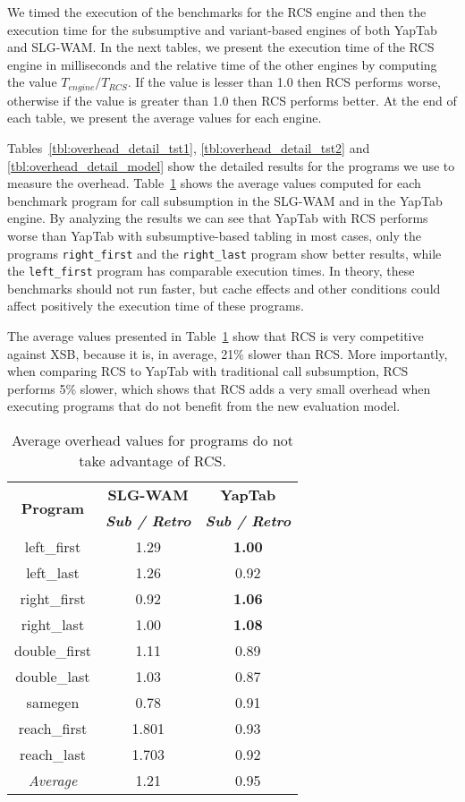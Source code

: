 We timed the execution of the benchmarks for the RCS engine and then the execution time
for the subsumptive and variant-based engines of both YapTab and SLG-WAM. In the next tables,
we present the execution time of the RCS engine in milliseconds and the relative time
of the other engines by computing the value $T_{engine} / T_{RCS}$.
If the value is lesser than 1.0 then RCS performs worse, otherwise if the value is greater than
1.0 then RCS performs better. At the end of each table, we present the average values for
each engine.

Tables~\ref{tbl:overhead_detail_tst1}, \ref{tbl:overhead_detail_tst2} and \ref{tbl:overhead_detail_model}
show the detailed results for the programs we use to measure the overhead.
Table~\ref{tbl:overhead_overview} shows the average values computed for each benchmark program
for call subsumption in the SLG-WAM and in the YapTab engine.
By analyzing the results we can see that YapTab with RCS performs worse
than YapTab with subsumptive-based tabling in most cases, only the
programs \texttt{right\_first} and the \texttt{right\_last} program show better results,
while the \texttt{left\_first} program has comparable execution times.
In theory, these benchmarks should not run faster, but cache effects and other
conditions could affect positively the execution time of these programs.

The average values presented in Table~\ref{tbl:overhead_overview} show that
RCS is very competitive against XSB, because it is, in average, 21\% slower than RCS. More
importantly, when comparing RCS to YapTab with traditional call subsumption, RCS performs 5\% slower,
which shows that RCS adds a very small overhead when executing programs that do not benefit from the
new evaluation model.

\begin{table}[ht]
\centering
  \begin{tabular}{ccc}
   \hline
    \hline
    \multirow{2}{*}{\textbf{Program}} & \textbf{SLG-WAM} & \textbf{YapTab} \\
    & \textbf{\textit{\small{Sub / Retro}}} & \textbf{\textit{\small{Sub / Retro}}} \\
   \hline
   \hline
   left\_first & 1.29 & \textbf{1.00} \\
   left\_last &  1.26  & 0.92 \\
   right\_first & 0.92 & \textbf{1.06} \\
   right\_last & 1.00 & \textbf{1.08} \\
   double\_first & 1.11 & 0.89 \\
   double\_last & 1.03 & 0.87 \\
   samegen & 0.78 & 0.91 \\
   reach\_first  &  1.801  & 0.93 \\
   reach\_last  &  1.703  & 0.92 \\
\hline
\hline
\textit{Average} &  1.21 &  0.95 \\
\hline
\hline
\end{tabular}
\caption{Average overhead values for programs do not take advantage of RCS.}
\label{tbl:overhead_overview}
\end{table}

